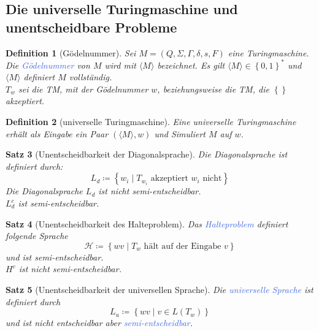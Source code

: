 \documentclass[11pt]{article}
\newcommand{\tcol}[1]{\textcolor{RoyalBlue}{#1}}
\newcommand{\set}[1]{\left\lbrace #1\right\rbrace}
\theoremstyle{break}
\newtheorem{satz}{Satz}[section]
\newtheorem{defi}[satz]{Definition}
\begin{document}
    \subsection{Die universelle Turingmaschine und unentscheidbare Probleme}
	\label{subsec:die-universelle-turingmaschineindexund-unentscheidbare-problemeindex}

    \begin{defi}[Gödelnummer]
        Sei $M=(Q,\Sigma,\Gamma,\delta,s,F)$ eine Turingmaschine.
        Die \tcol{Gödelnummer} von $M$ wird mit $\langle M\rangle$ bezeichnet.
        Es gilt $\langle M\rangle\in\set{0,1}^*$ und $\langle M\rangle$ definiert $M$ vollständig.\\
        $T_w$ sei die TM, mit der Gödelnummer $w$, beziehungsweise die TM, die $\set{}$ akzeptiert.
    \end{defi}

    \begin{defi}[universelle Turingmaschine]
        Eine universelle Turingmaschine erhält als Eingabe ein Paar $(\langle M\rangle,w)$ und Simuliert $M$ auf $w$.
    \end{defi}

    \begin{satz}[Unentscheidbarkeit der Diagonalsprache]
        Die Diagonalsprache ist definiert durch:
        \[L_d\coloneqq\set{w_i\mid T_{w_i}\text{ akzeptiert }w_i\text{ nicht}}\]
        Die Diagonalsprache $L_d$ ist nicht semi-entscheidbar.\\
        $L_d^c$ ist semi-entscheidbar.
    \end{satz}

    \begin{satz}[Unentscheidbarkeit des Halteproblem]
        Das \tcol{Halteproblem} definiert folgende Sprache
        \[\mathcal{H}\coloneqq\set{wv\mid T_w\text{ hält auf der Eingabe }v}\]
        und ist semi-entscheidbar.\\
        $H^c$ ist nicht semi-entscheidbar.
    \end{satz}

    \begin{satz}[Unentscheidbarkeit der universellen Sprache]
        Die \tcol{universelle Sprache} ist definiert durch
        \[L_u\coloneqq\set{wv\mid v\in L(T_w)}\]
        und ist nicht entscheidbar aber \tcol{semi-entscheidbar}.
    \end{satz}
\end{document}
